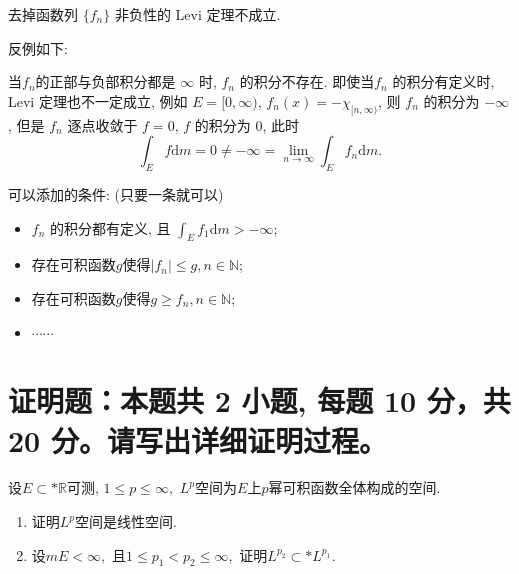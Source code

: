\begin{solution}
去掉函数列 \(\{f_n\}\) 非负性的 Levi 定理不成立. 

反例如下: 

当\(f_n\)的正部与负部积分都是 \(\infty\) 时, \(f_n\) 的积分不存在. 即使当\(f_n\) 的积分有定义时, Levi 定理也不一定成立, 例如 \(E = [0, \infty)\), \(f_n(x) = - \chi_{[n, \infty)}\), 则 \(f_n\) 的积分为 \(- \infty\), 但是 \(f_n\) 逐点收敛于 \(f = 0\), \(f\) 的积分为 \(0\), 此时
\[\int_E f \mathrm{d} m = 0 \neq - \infty = \lim_{n \to \infty} \int_E f_n \mathrm{d} m.\]

可以添加的条件: (只要一条就可以) 
\begin{itemize}
\item \(f_n\) 的积分都有定义, 且
\(\displaystyle \int_E f_1 \mathrm{d} m > - \infty\);
\item 存在可积函数\(g\)使得\(\lvert f_n \rvert \leqslant g, n \in \mathbb{N}\);
\item 存在可积函数\(g\)使得\(g \geqslant f_n, n \in \mathbb{N}\);
\item \(\cdots\cdots\)
\end{itemize}
\end{solution}


\section{证明题：本题共 2 小题, 每题 10 分，共 20 分。请写出详细证明过程。}


\begin{question}[points = 10]
设$E \subset* \mathbb{R}$可测, $1 \leqslant p \leqslant \infty,$ $L^p$空间为$E$上$p$幂可积函数全体构成的空间.
\begin{enumerate}
\item 证明$L^p$空间是线性空间.
\item 设$m E < \infty,$ 且$1 \leqslant p_1 < p_2 \leqslant \infty,$ 证明$L^{p_2} \subset* L^{p_1}.$
\end{enumerate}

\end{question}

